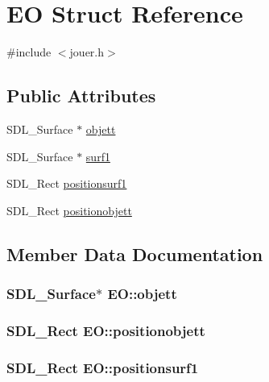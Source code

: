 \hypertarget{structEO}{}\section{EO Struct Reference}
\label{structEO}


{\ttfamily \#include $<$jouer.\+h$>$}

\subsection*{Public Attributes}
\begin{DoxyCompactItemize}
\item 
S\+D\+L\+\_\+\+Surface $\ast$ \hyperlink{structEO_a440e261b4a7362bbdd45bf0d508c1d7e}{objett}
\item 
S\+D\+L\+\_\+\+Surface $\ast$ \hyperlink{structEO_ad31ed54635cf3fe538735cad72b6b193}{surf1}
\item 
S\+D\+L\+\_\+\+Rect \hyperlink{structEO_ac7eceabf11ec9d5d46fa4797f12808cf}{positionsurf1}
\item 
S\+D\+L\+\_\+\+Rect \hyperlink{structEO_ab237ce3fb3169facada2f9794297d6cd}{positionobjett}
\end{DoxyCompactItemize}


\subsection{Member Data Documentation}
\subsubsection[{\texorpdfstring{objett}{objett}}]{\setlength{\rightskip}{0pt plus 5cm}S\+D\+L\+\_\+\+Surface$\ast$ E\+O\+::objett}\hypertarget{structEO_a440e261b4a7362bbdd45bf0d508c1d7e}{}\label{structEO_a440e261b4a7362bbdd45bf0d508c1d7e}
\subsubsection[{\texorpdfstring{positionobjett}{positionobjett}}]{\setlength{\rightskip}{0pt plus 5cm}S\+D\+L\+\_\+\+Rect E\+O\+::positionobjett}\hypertarget{structEO_ab237ce3fb3169facada2f9794297d6cd}{}\label{structEO_ab237ce3fb3169facada2f9794297d6cd}
\subsubsection[{\texorpdfstring{positionsurf1}{positionsurf1}}]{\setlength{\rightskip}{0pt plus 5cm}S\+D\+L\+\_\+\+Rect E\+O\+::positionsurf1}\hypertarget{structEO_ac7eceabf11ec9d5d46fa4797f12808cf}{}\label{structEO_ac7eceabf11ec9d5d46fa4797f12808cf}
